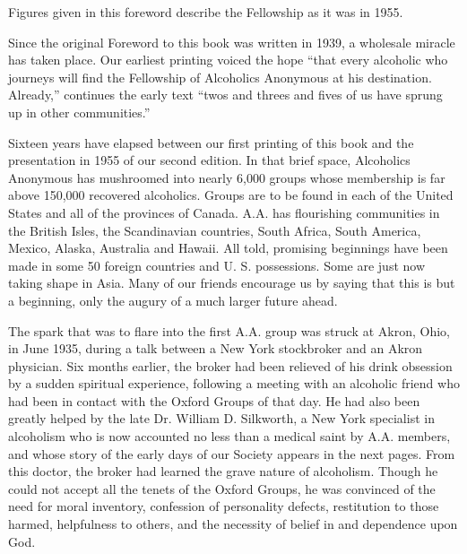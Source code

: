 \begin{biblechapter}
    Figures given in this foreword describe the
    Fellowship as it was in 1955.

\verse Since the original Foreword to this book was written in 1939, 
    a wholesale miracle has taken place. 
\verse Our earliest printing voiced the hope 
    “that every alcoholic who journeys 
    will find the Fellowship of Alcoholics Anonymous at his destination. 
    Already,”
    continues the early text 
    “twos and threes and fives of us have sprung up in other communities.”

    Sixteen years have elapsed between our first printing of this book 
    and the presentation in 1955 of our second edition.
\verse In that brief space, 
    Alcoholics Anonymous has mushroomed into nearly 6,000 groups 
    whose membership is far above 150,000 recovered alcoholics.
\verse Groups are to be found in each of the United States 
    and all of the provinces of Canada.
\verse A.A. has flourishing communities 
    in the British Isles, the Scandinavian countries, South Africa, 
    South America, Mexico, Alaska, Australia and Hawaii. 
\verse All told, promising beginnings have been made 
    in some 50 foreign countries and U. S. possessions. 
\verse Some are just now taking shape in Asia. 
\verse Many of our friends encourage us by saying that 
    this is but a beginning, 
    only the augury of a much larger future ahead.

    The spark that was to flare into the first A.A. group 
    was struck at Akron, Ohio, in June 1935, 
    during a talk between a New York stockbroker and an Akron physician. 
\verse Six months earlier, 
    the broker had been relieved of his drink obsession 
    by a sudden spiritual experience, %
    following a meeting with an alcoholic friend 
    who had been in contact with the Oxford Groups of that day. 
\verse He had also been greatly helped by 
    the late Dr. William D. Silkworth, 
    a New York specialist in alcoholism who 
    is now accounted no less than a medical saint by A.A. members, 
    and whose story of the early days of our Society 
    appears in the next pages. 
\verse From this doctor, 
    the broker had learned the grave nature of alcoholism. 
\verse Though he could not accept all the tenets of the Oxford Groups, 
    he was convinced of the need for moral inventory, 
    confession of personality defects, 
    restitution to those harmed, 
    helpfulness to others, 
    and the necessity of belief in and dependence upon God.


\end{biblechapter}
